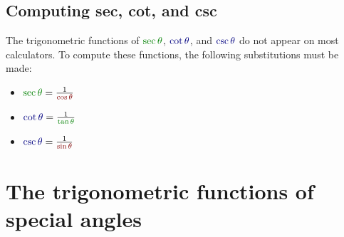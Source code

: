 \documentclass{article}
\newcommand{\dr}[1]{\textcolor{dark_red}{#1}}
\newcommand{\dg}[1]{\textcolor{dark_green}{#1}}
\newcommand{\db}[1]{\textcolor{dark_blue}{#1}}
\begin{document}
\subsection{Computing sec, cot, and csc}

The trigonometric functions of \(\dg{\sec\theta}\), \(\db{\cot\theta}\), and \(\db{\csc\theta}\) do not appear on most calculators. To compute these functions, the following substitutions must be made:

\begin{itemize}
\item \(\dg{\sec\theta} = \frac{1}{\dr{\cos\theta}}\)
\item \(\db{\cot\theta} = \frac{1}{\dg{\tan\theta}}\)
\item \(\db{\csc\theta} = \frac{1}{\dr{\sin\theta}}\)
\end{itemize}




\section{The trigonometric functions of special angles}
\end{document}
